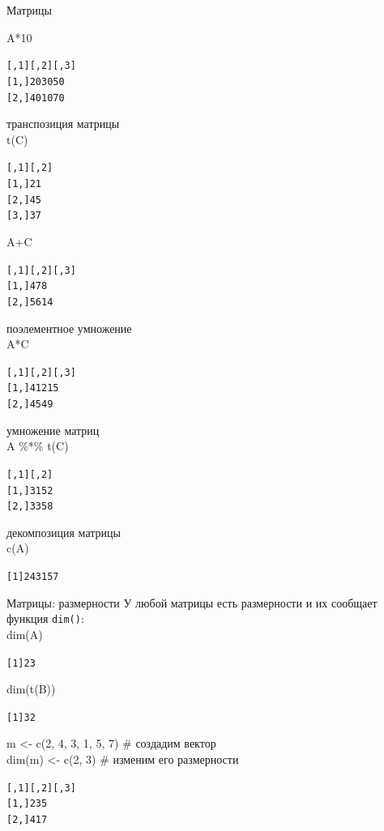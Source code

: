 \begin{frame}[fragile]{Матрицы}
\begin{multicols}{2}
\begin{itemize}
\mytem A*10 \medskip
\footnotesize 
\begin{alltt}
     [,1] [,2] [,3]
[1,]   20   30   50
[2,]   40   10   70
\end{alltt}
\normalsize
\bigskip
\mytem транспозиция матрицы \\ t(C) \medskip
\footnotesize 
\begin{alltt}
     [,1] [,2]
[1,]    2    1
[2,]    4    5
[3,]    3    7
\end{alltt}
\normalsize
\bigskip
\mytem A+C \medskip
\footnotesize 
\begin{alltt}
     [,1] [,2] [,3]
[1,]    4    7    8
[2,]    5    6   14
\end{alltt}
\normalsize
\columnbreak
\mytem поэлементное умножение \\ A*C  \medskip
\footnotesize 
\begin{alltt}
     [,1] [,2] [,3]
[1,]    4   12   15
[2,]    4    5   49
\end{alltt}
\normalsize
\vfill
\mytem умножение матриц \\ A \%*\% t(C) \medskip
\footnotesize 
\begin{alltt}
     [,1] [,2]
[1,]   31   52
[2,]   33   58
\end{alltt}
\normalsize
\vfill
\mytem декомпозиция матрицы \\ c(A) \medskip
\footnotesize 
\begin{alltt}
[1] 2 4 3 1 5 7
\end{alltt}
\normalsize
\end{itemize}
\end{multicols}
\end{frame}

\begin{frame}[fragile]{Матрицы: размерности}
У любой матрицы есть размерности и их сообщает функция \footnotesize\verb"dim()"\normalsize:\\
dim(A)
\footnotesize 
\begin{alltt}
[1] 2 3
\end{alltt}
\normalsize
dim(t(B))
\footnotesize 
\begin{alltt}
[1] 3 2
\end{alltt}
\vfill
\normalsize
m <- c(2, 4, 3, 1, 5, 7) \hfill \# создадим вектор\\
dim(m) <- c(2, 3) \hfill \# изменим его размерности
\footnotesize 
\begin{alltt}
     [,1] [,2] [,3]
[1,]    2    3    5
[2,]    4    1    7
\end{alltt}
\normalsize
\end{frame}
